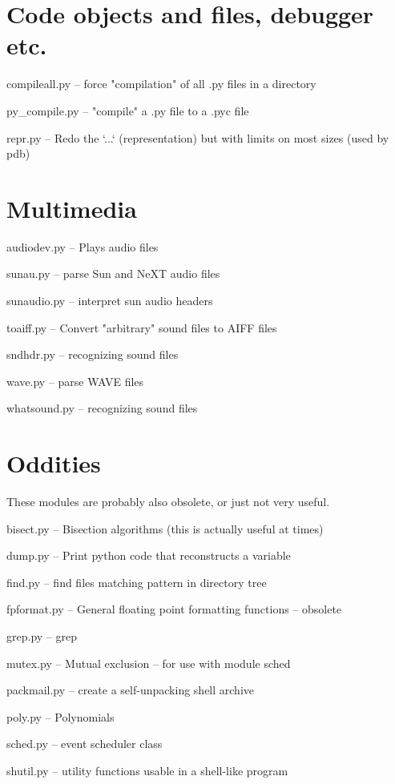 \section{Code objects and files, debugger etc.}

compileall.py -- force "compilation" of all .py files in a directory

py_compile.py -- "compile" a .py file to a .pyc file

repr.py -- Redo the `...` (representation) but with limits on most
sizes (used by pdb)


\section{Multimedia}

audiodev.py -- Plays audio files

sunau.py -- parse Sun and NeXT audio files

sunaudio.py -- interpret sun audio headers

toaiff.py -- Convert "arbitrary" sound files to AIFF files

sndhdr.py -- recognizing sound files

wave.py -- parse WAVE files

whatsound.py -- recognizing sound files


\section{Oddities}

These modules are probably also obsolete, or just not very useful.

bisect.py -- Bisection algorithms (this is actually useful at times)

dump.py -- Print python code that reconstructs a variable

find.py -- find files matching pattern in directory tree

fpformat.py -- General floating point formatting functions -- obsolete

grep.py -- grep

mutex.py -- Mutual exclusion -- for use with module sched

packmail.py -- create a self-unpacking \UNIX{} shell archive

poly.py -- Polynomials

sched.py -- event scheduler class

shutil.py -- utility functions usable in a shell-like program

